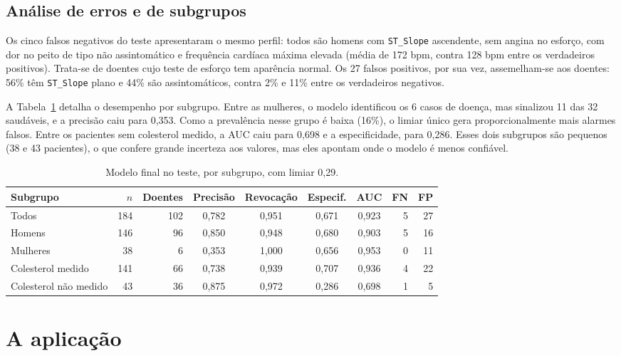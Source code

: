 \documentclass[12pt]{article}
\begin{document}
\subsection{Análise de erros e de subgrupos}

Os cinco falsos negativos do teste apresentaram o mesmo perfil: todos são
homens com \texttt{ST\_Slope} ascendente, sem angina no esforço, com dor no
peito de tipo não assintomático e frequência cardíaca máxima elevada (média
de 172 bpm, contra 128 bpm entre os verdadeiros positivos). Trata-se de
doentes cujo teste de esforço tem aparência normal. Os 27 falsos positivos,
por sua vez, assemelham-se aos doentes: 56\% têm \texttt{ST\_Slope} plano e
44\% são assintomáticos, contra 2\% e 11\% entre os verdadeiros negativos.

A Tabela~\ref{tab:subgrupos} detalha o desempenho por subgrupo. Entre as
mulheres, o modelo identificou os 6 casos de doença, mas sinalizou 11 das 32
saudáveis, e a precisão caiu para 0,353. Como a prevalência nesse grupo é
baixa (16\%), o limiar único gera proporcionalmente mais alarmes falsos.
Entre os pacientes sem colesterol medido, a AUC caiu para 0,698 e a
especificidade, para 0,286. Esses dois subgrupos são pequenos (38 e 43
pacientes), o que confere grande incerteza aos valores, mas eles apontam
onde o modelo é menos confiável.

\begin{table}[!htb]
\centering
\caption{Modelo final no teste, por subgrupo, com limiar 0,29.}
\label{tab:subgrupos}
\footnotesize\setlength{\tabcolsep}{4.5pt}
\begin{tabular}{@{}lrrccccrr@{}}
\toprule
Subgrupo & $n$ & Doentes & Precisão & Revocação & Especif. & AUC & FN & FP \\
\midrule
Todos & 184 & 102 & 0,782 & 0,951 & 0,671 & 0,923 & 5 & 27 \\
Homens & 146 & 96 & 0,850 & 0,948 & 0,680 & 0,903 & 5 & 16 \\
Mulheres & 38 & 6 & 0,353 & 1,000 & 0,656 & 0,953 & 0 & 11 \\
Colesterol medido & 141 & 66 & 0,738 & 0,939 & 0,707 & 0,936 & 4 & 22 \\
Colesterol não medido & 43 & 36 & 0,875 & 0,972 & 0,286 & 0,698 & 1 & 5 \\
\bottomrule
\end{tabular}
\end{table}

\section{A aplicação}
\label{sec:aplicacao}
\end{document}
